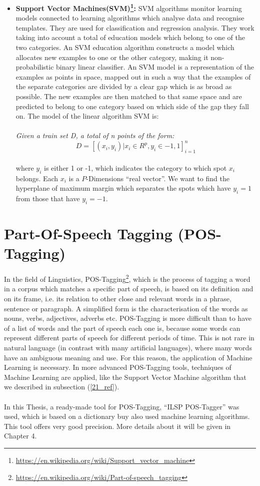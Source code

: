 \begin{itemize}
	\item \textbf{Support Vector Machines(SVM)\footnote{\url{https://en.wikipedia.org/wiki/Support_vector_machine}}:} SVM algorithms monitor learning models connected to learning algorithms which analyse data and recognise templates. They are used for classification and regression analysis. They work taking into account a total of education models which belong to one of the two categories. An SVM education algorithm constructs a model which allocates new examples to one or the other category, making it non-probabilistic binary linear classifier. An SVM model is a representation of the examples as points in space, mapped out in such a way that the examples of the separate categories are divided by a clear gap which is as broad as possible. The new examples are then matched to that same space and are predicted to belong to one category based on which side of the gap they fall on. The model of the linear algorithm  SVM is:\\
\\
\textit{Given a train set D, a total of n points of the form:}
\\
\begin{equation}
D=\left[(x_{i},y_{i})|x_{i}\in R^{p},y_{i}\in{-1,1}\right]_{i=1}^{n}
\end{equation}
\\
where $y_{i}$ is either 1 or -1, which indicates the category to which spot $x_{i}$ belongs. Each $x_{i}$ is a $P$-Dimensions ``real vector''. We want to find the hyperplane of maximum margin which separates the spots which have $y_{i}=1$ from those that have $y_{i}=-1$.

\end{itemize}
\section{Part-Of-Speech Tagging (POS-Tagging)}\label{22_ref}
In the field of Linguistics, POS-Tagging\footnote{\url{https://en.wikipedia.org/wiki/Part-of-speech_tagging}}, which is the process of tagging a word in a corpus which matches a specific part of speech, is based  on its definition and on its frame, i.e. its relation to other close and relevant words in a phrase, sentence or paragraph. A simplified form is the characterisation of the words as nouns, verbs, adjectives, adverbs etc. POS-Tagging is more difficult than to have of a list of words and the part of speech each one is, because some words can represent different parts of speech for different periods of time. This is not rare in natural language (in contrast with many artificial languages), where many words have an ambiguous meaning and use. For this reason, the application of Machine Learning is necessary. In more advanced POS-Tagging tools, techniques of Machine Learning are applied, like the Support Vector Machine algorithm that we described in subsection (\ref{21_ref}).\\
\\
In this Thesis, a ready-made tool for POS-Tagging, ``ILSP POS-Tagger'' was used, which is based on a dictionary buy also used machine learning algorithms. This tool offers very good precision. More details about it will be given in Chapter 4.

